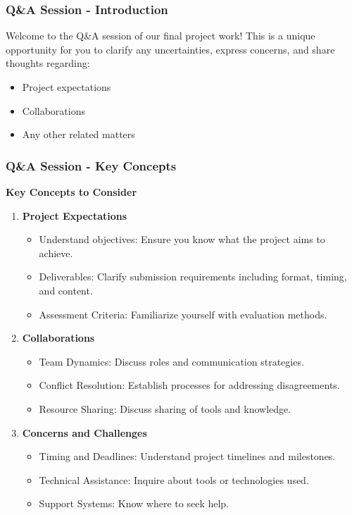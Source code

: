 \documentclass[aspectratio=169]{beamer}
\begin{document}
\begin{frame}[fragile]
    \frametitle{Q\&A Session - Introduction}
    Welcome to the Q\&A session of our final project work! This is a unique opportunity for you to clarify any uncertainties, express concerns, and share thoughts regarding:
    \begin{itemize}
        \item Project expectations
        \item Collaborations
        \item Any other related matters
    \end{itemize}
\end{frame}

\begin{frame}[fragile]
    \frametitle{Q\&A Session - Key Concepts}
    \textbf{Key Concepts to Consider}

    \begin{enumerate}
        \item \textbf{Project Expectations}
        \begin{itemize}
            \item Understand objectives: Ensure you know what the project aims to achieve.
            \item Deliverables: Clarify submission requirements including format, timing, and content.
            \item Assessment Criteria: Familiarize yourself with evaluation methods.
        \end{itemize}
        
        \item \textbf{Collaborations}
        \begin{itemize}
            \item Team Dynamics: Discuss roles and communication strategies.
            \item Conflict Resolution: Establish processes for addressing disagreements.
            \item Resource Sharing: Discuss sharing of tools and knowledge.
        \end{itemize}

        \item \textbf{Concerns and Challenges}
        \begin{itemize}
            \item Timing and Deadlines: Understand project timelines and milestones.
            \item Technical Assistance: Inquire about tools or technologies used.
            \item Support Systems: Know where to seek help.
        \end{itemize}
    \end{enumerate}
\end{frame}
\end{document}
